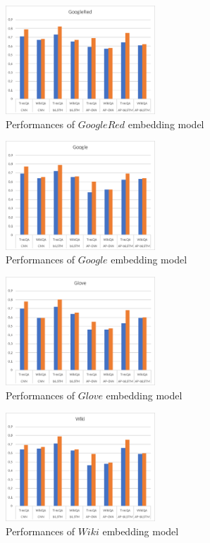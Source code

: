 \documentclass[11pt,a4paper]{article}
\begin{document}
\begin{figure}[ht]
    \centering
    \includegraphics[width=0.5\textwidth]{google.eps}
    \caption{Performances of $GoogleRed$ embedding model}
    \label{picture:google}
\end{figure}
\begin{figure}[ht]
    \centering
    \includegraphics[width=0.5\textwidth]{googlered.eps}
    \caption{Performances of $Google$ embedding model}
    \label{picture:googlered}
\end{figure}
\begin{figure}[ht]
    \centering
    \includegraphics[width=0.5\textwidth]{glove.eps}
    \caption{Performances of $Glove$ embedding model}
    \label{picture:glove}
\end{figure}
\begin{figure}[ht]
    \centering
    \includegraphics[width=0.5\textwidth]{wiki.eps}
    \caption{Performances of $Wiki$ embedding model}
    \label{picture:wiki}
\end{figure}
\end{document}
